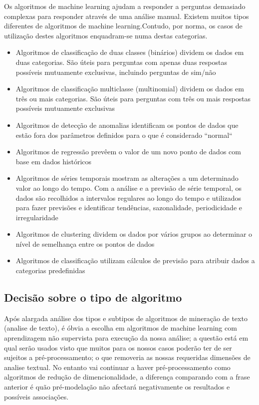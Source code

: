 \documentclass[a4paper,10pt]{article}
\begin{document}
Os algoritmos de machine learning ajudam a responder a perguntas demasiado complexas para responder através de uma análise manual.
Existem muitos tipos diferentes de algoritmos de machine learning.Contudo, por norma, os casos de utilização destes algoritmos enquadram-se numa destas categorias.
\begin{itemize}
    \item Algoritmos de classificação de duas classes (binários) dividem os dados em duas categorias. São úteis para perguntas com apenas duas respostas possíveis mutuamente exclusivas, incluindo perguntas de sim/não
    \item Algoritmos de classificação multiclasse (multinomial) dividem os dados em três ou mais categorias. São úteis para perguntas com três ou mais respostas possíveis mutuamente exclusivas
    \item Algoritmos de detecção de anomalias identificam os pontos de dados que estão fora dos parâmetros definidos para o que é considerado ``normal``
    \item Algoritmos de regressão prevêem o valor de um novo ponto de dados com base em dados históricos
    \item Algoritmos de séries temporais mostram as alterações a um determinado valor ao longo do tempo. Com a análise e a previsão de série temporal, os dados são recolhidos a intervalos regulares ao longo do tempo e utilizados para fazer previsões e identificar tendências, sazonalidade, periodicidade e irregularidade
    \item Algoritmos de clustering dividem os dados por vários grupos ao determinar o nível de semelhança entre os pontos de dados
    \item Algoritmos de classificação utilizam cálculos de previsão para atribuir dados a categorias predefinidas
\end{itemize}

\subsection{Decisão sobre o tipo de algoritmo}

Após alargada análise dos tipos e subtipos de algoritmos de mineração de texto (analise de texto), é óbvia a escolha em algoritmos de machine learning com aprendizagem não supervista para execução da nossa análise; a questão está em qual serão usados visto que muitos para os nossos casos poderão ter de ser sujeitos a pré-processamento; o que removeria as nossas requeridas dimensões de analise textual.
No entanto vai continuar a haver pré-processamento como algoritmos de redução de dimencionalidade, a diferença comparando com a frase anterior é quão pré-modelação não afectará negativamente os resultados e possíveis associações.
\end{document}
